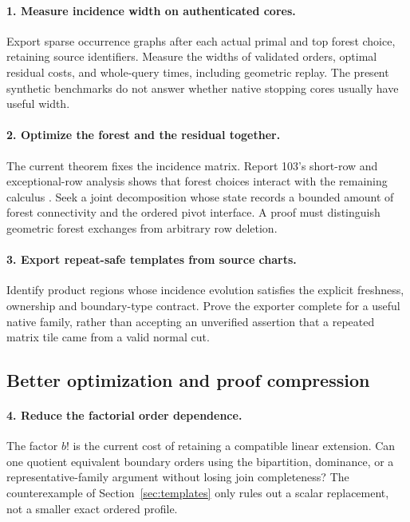 \documentclass[11pt,a4paper]{article}
\theoremstyle{definition}
\theoremstyle{remark}
\begin{document}
\paragraph{1. Measure incidence width on authenticated cores.}
Export sparse occurrence graphs after each actual primal and top forest
choice, retaining source identifiers. Measure the widths of validated
orders, optimal residual costs, and whole-query times, including geometric
replay. The present synthetic benchmarks do not answer whether native
stopping cores usually have useful width.

\paragraph{2. Optimize the forest and the residual together.}
The current theorem fixes the incidence matrix. Report 103's short-row
and exceptional-row analysis shows that forest choices interact with the
remaining calculus \cite{repo103}. Seek a joint decomposition whose state
records a bounded amount of forest connectivity and the ordered pivot
interface. A proof must distinguish geometric forest exchanges from
arbitrary row deletion.

\paragraph{3. Export repeat-safe templates from source charts.}
Identify product regions whose incidence evolution satisfies the explicit
freshness, ownership and boundary-type contract. Prove the exporter complete
for a useful native family, rather than accepting an unverified assertion
that a repeated matrix tile came from a valid normal cut.

\subsection{Better optimization and proof compression}
\paragraph{4. Reduce the factorial order dependence.}
The factor $b!$ is the current cost of retaining a compatible linear
extension. Can one quotient equivalent boundary orders using the
bipartition, dominance, or a representative-family argument without losing
join completeness? The counterexample of Section~\ref{sec:templates}
only rules out a scalar replacement, not a smaller exact ordered profile.
\end{document}
